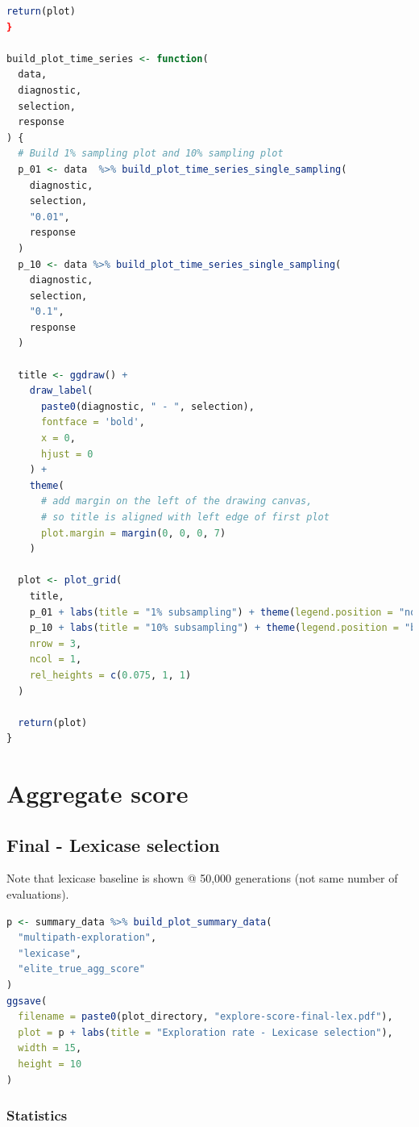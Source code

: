 \documentclass[
]{book}
\begin{document}
\begin{lstlisting}[language=R]
  return(plot)
}

build_plot_time_series <- function(
  data,
  diagnostic,
  selection,
  response
) {
  # Build 1% sampling plot and 10% sampling plot
  p_01 <- data  %>% build_plot_time_series_single_sampling(
    diagnostic,
    selection,
    "0.01",
    response
  )
  p_10 <- data %>% build_plot_time_series_single_sampling(
    diagnostic,
    selection,
    "0.1",
    response
  )

  title <- ggdraw() +
    draw_label(
      paste0(diagnostic, " - ", selection),
      fontface = 'bold',
      x = 0,
      hjust = 0
    ) +
    theme(
      # add margin on the left of the drawing canvas,
      # so title is aligned with left edge of first plot
      plot.margin = margin(0, 0, 0, 7)
    )

  plot <- plot_grid(
    title,
    p_01 + labs(title = "1% subsampling") + theme(legend.position = "none"),
    p_10 + labs(title = "10% subsampling") + theme(legend.position = "bottom"),
    nrow = 3,
    ncol = 1,
    rel_heights = c(0.075, 1, 1)
  )

  return(plot)
}
\end{lstlisting}

\hypertarget{aggregate-score-1}{%
\section{Aggregate score}\label{aggregate-score-1}}

\hypertarget{final---lexicase-selection-2}{%
\subsection{Final - Lexicase selection}\label{final---lexicase-selection-2}}

Note that lexicase baseline is shown @ 50,000 generations (not same number of evaluations).

\begin{lstlisting}[language=R]
p <- summary_data %>% build_plot_summary_data(
  "multipath-exploration",
  "lexicase",
  "elite_true_agg_score"
)
ggsave(
  filename = paste0(plot_directory, "explore-score-final-lex.pdf"),
  plot = p + labs(title = "Exploration rate - Lexicase selection"),
  width = 15,
  height = 10
)
\end{lstlisting}

\hypertarget{statistics-1}{%
\subsubsection{Statistics}\label{statistics-1}}
\end{document}
